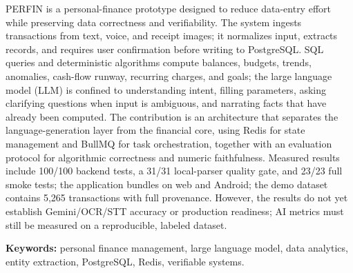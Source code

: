 
PERFIN is a personal-finance prototype designed to reduce data-entry effort
while preserving data correctness and verifiability. The system ingests
transactions from text, voice, and receipt images; it normalizes input,
extracts records, and requires user confirmation before writing to
PostgreSQL. SQL queries and deterministic algorithms compute balances,
budgets, trends, anomalies, cash-flow runway, recurring charges, and goals;
the large language model (LLM) is confined to understanding intent, filling
parameters, asking clarifying questions when input is ambiguous, and
narrating facts that have already been computed. The contribution is an
architecture that separates the language-generation layer from the financial
core, using Redis for state management and BullMQ for task orchestration,
together with an evaluation protocol for algorithmic correctness and numeric
faithfulness. Measured results include 100/100 backend tests, a 31/31
local-parser quality gate, and 23/23 full smoke tests; the application bundles
on web and Android; the demo dataset contains 5,265 transactions with full
provenance. However, the results do not yet establish Gemini/OCR/STT accuracy
or production readiness; AI metrics must still be measured on a reproducible,
labeled dataset.

\vspace{0.5cm}
\noindent\textbf{Keywords:} personal finance management, large language model,
data analytics, entity extraction, PostgreSQL, Redis, verifiable systems.
